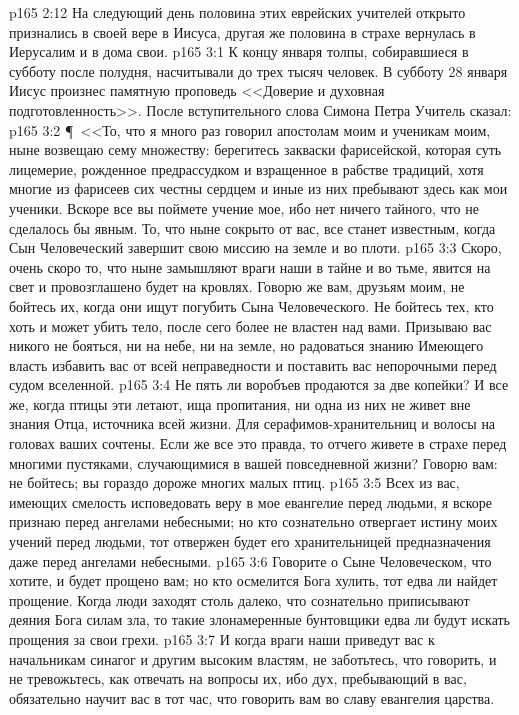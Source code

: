 \vs p165 2:12 На следующий день половина этих еврейских учителей открыто признались в своей вере в Иисуса, другая же половина в страхе вернулась в Иерусалим и в дома свои.
\vs p165 3:1 К концу января толпы, собиравшиеся в субботу после полудня, насчитывали до трех тысяч человек. В субботу 28 января Иисус произнес памятную проповедь <<Доверие и духовная подготовленность>>. После вступительного слова Симона Петра Учитель сказал:
\vs p165 3:2 \P\ <<То, что я много раз говорил апостолам моим и ученикам моим, ныне возвещаю сему множеству: берегитесь закваски фарисейской, которая суть лицемерие, рожденное предрассудком и взращенное в рабстве традиций, хотя многие из фарисеев сих честны сердцем и иные из них пребывают здесь как мои ученики. Вскоре все вы поймете учение мое, ибо нет ничего тайного, что не сделалось бы явным. То, что ныне сокрыто от вас, все станет известным, когда Сын Человеческий завершит свою миссию на земле и во плоти.
\vs p165 3:3 Скоро, очень скоро то, что ныне замышляют враги наши в тайне и во тьме, явится на свет и провозглашено будет на кровлях. Говорю же вам, друзьям моим, не бойтесь их, когда они ищут погубить Сына Человеческого. Не бойтесь тех, кто хоть и может убить тело, после сего более не властен над вами. Призываю вас никого не бояться, ни на небе, ни на земле, но радоваться знанию Имеющего власть избавить вас от всей неправедности и поставить вас непорочными перед судом вселенной.
\vs p165 3:4 Не пять ли воробъев продаются за две копейки? И все же, когда птицы эти летают, ища пропитания, ни одна из них не живет вне знания Отца, источника всей жизни. Для серафимов\hyp{}хранительниц и волосы на головах ваших сочтены. Если же все это правда, то отчего живете в страхе перед многими пустяками, случающимися в вашей повседневной жизни? Говорю вам: не бойтесь; вы гораздо дороже многих малых птиц.
\vs p165 3:5 Всех из вас, имеющих смелость исповедовать веру в мое евангелие перед людьми, я вскоре признаю перед ангелами небесными; но кто сознательно отвергает истину моих учений перед людьми, тот отвержен будет его хранительницей предназначения даже перед ангелами небесными.
\vs p165 3:6 Говорите о Сыне Человеческом, что хотите, и будет прощено вам; но кто осмелится Бога хулить, тот едва ли найдет прощение. Когда люди заходят столь далеко, что сознательно приписывают деяния Бога силам зла, то такие злонамеренные бунтовщики едва ли будут искать прощения за свои грехи.
\vs p165 3:7 И когда враги наши приведут вас к начальникам синагог и другим высоким властям, не заботьтесь, что говорить, и не тревожьтесь, как отвечать на вопросы их, ибо дух, пребывающий в вас, обязательно научит вас в тот час, что говорить вам во славу евангелия царства.
